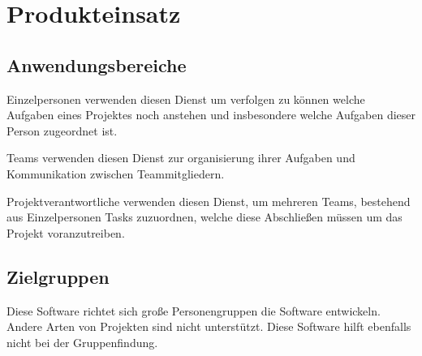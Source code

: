 
\section{Produkteinsatz}

\subsection{Anwendungsbereiche}
Einzelpersonen verwenden diesen Dienst um verfolgen zu können welche Aufgaben eines Projektes noch anstehen und insbesondere welche Aufgaben dieser Person zugeordnet ist. \par Teams verwenden diesen Dienst zur organisierung ihrer Aufgaben und Kommunikation zwischen Teammitgliedern. \par Projektverantwortliche verwenden diesen Dienst, um mehreren Teams, bestehend aus Einzelpersonen Tasks zuzuordnen, welche diese Abschließen müssen um das Projekt voranzutreiben.

\subsection{Zielgruppen}
Diese Software richtet sich große Personengruppen die Software entwickeln. Andere Arten von Projekten sind nicht unterstützt. Diese Software hilft ebenfalls nicht bei der Gruppenfindung.
